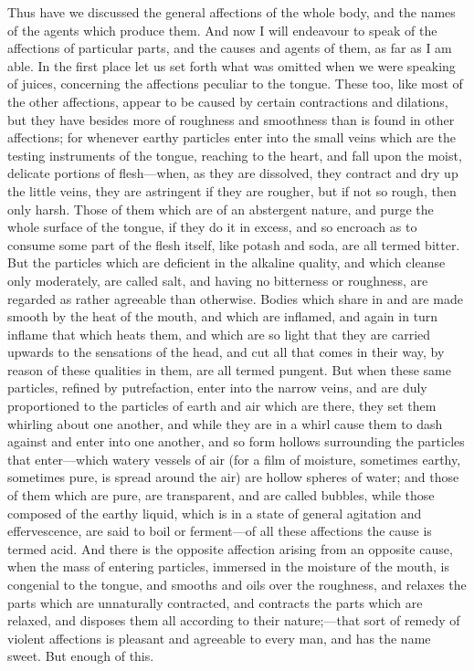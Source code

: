 \documentclass[11pt,letter]{article}
\begin{document}
\par  Thus have we discussed the general affections of the whole body, and the names of the agents which produce them. And now I will endeavour to speak of the affections of particular parts, and the causes and agents of them, as far as I am able. In the first place let us set forth what was omitted when we were speaking of juices, concerning the affections peculiar to the tongue. These too, like most of the other affections, appear to be caused by certain contractions and dilations, but they have besides more of roughness and smoothness than is found in other affections; for whenever earthy particles enter into the small veins which are the testing instruments of the tongue, reaching to the heart, and fall upon the moist, delicate portions of flesh—when, as they are dissolved, they contract and dry up the little veins, they are astringent if they are rougher, but if not so rough, then only harsh. Those of them which are of an abstergent nature, and purge the whole surface of the tongue, if they do it in excess, and so encroach as to consume some part of the flesh itself, like potash and soda, are all termed bitter. But the particles which are deficient in the alkaline quality, and which cleanse only moderately, are called salt, and having no bitterness or roughness, are regarded as rather agreeable than otherwise. Bodies which share in and are made smooth by the heat of the mouth, and which are inflamed, and again in turn inflame that which heats them, and which are so light that they are carried upwards to the sensations of the head, and cut all that comes in their way, by reason of these qualities in them, are all termed pungent. But when these same particles, refined by putrefaction, enter into the narrow veins, and are duly proportioned to the particles of earth and air which are there, they set them whirling about one another, and while they are in a whirl cause them to dash against and enter into one another, and so form hollows surrounding the particles that enter—which watery vessels of air (for a film of moisture, sometimes earthy, sometimes pure, is spread around the air) are hollow spheres of water; and those of them which are pure, are transparent, and are called bubbles, while those composed of the earthy liquid, which is in a state of general agitation and effervescence, are said to boil or ferment—of all these affections the cause is termed acid. And there is the opposite affection arising from an opposite cause, when the mass of entering particles, immersed in the moisture of the mouth, is congenial to the tongue, and smooths and oils over the roughness, and relaxes the parts which are unnaturally contracted, and contracts the parts which are relaxed, and disposes them all according to their nature;—that sort of remedy of violent affections is pleasant and agreeable to every man, and has the name sweet. But enough of this.
\end{document}
